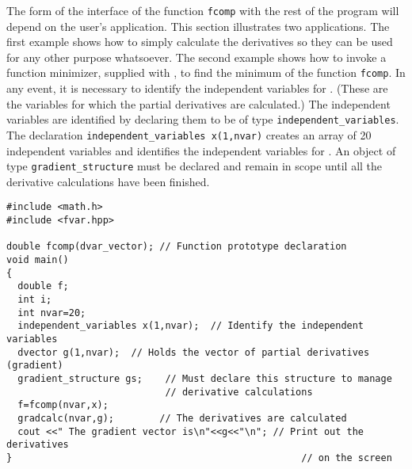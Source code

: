 \documentclass{admbmanual}
\begin{document}
The form of the interface of the function \texttt{fcomp}
with the rest of the program will depend on the user's 
application. This section illustrates two applications.
The first example shows how to simply calculate the derivatives so they can
be used for any other purpose whatsoever. 
The second example shows how to invoke a function minimizer, supplied with
\scAD, to
find the minimum of the function \texttt{fcomp}. 
In any event, it is necessary 
to identify the independent variables for \scAD. (These are the variables
for which the partial derivatives are calculated.) The 
independent variables are identified by declaring them to be of type
\texttt{independent\_variables}. 
The declaration \texttt{independent\_variables x(1,nvar)} 
creates an array of 20 independent variables and identifies the 
independent variables for \scAD. An object of type \texttt{gradient\_structure}
must be declared and remain in scope until all the derivative calculations
have been finished. 
\begin{lstlisting}
#include <math.h>
#include <fvar.hpp>

double fcomp(dvar_vector); // Function prototype declaration
void main()
{
  double f;
  int i;
  int nvar=20;
  independent_variables x(1,nvar);  // Identify the independent variables
  dvector g(1,nvar);  // Holds the vector of partial derivatives (gradient) 
  gradient_structure gs;    // Must declare this structure to manage 
                            // derivative calculations
  f=fcomp(nvar,x);
  gradcalc(nvar,g);        // The derivatives are calculated
  cout <<" The gradient vector is\n"<<g<<"\n"; // Print out the derivatives
}                                                   // on the screen
\end{lstlisting}

\end{document}
